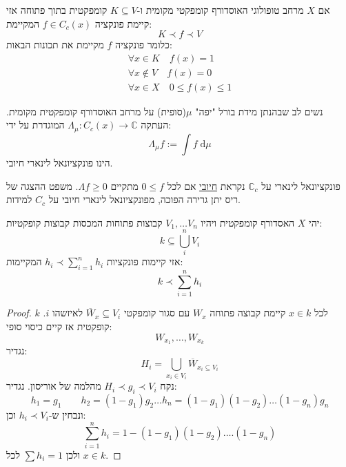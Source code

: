 \documentclass{tstextbook}
\begin{document}
\begin{theorem}
אם \(X\) מרחב טופולוגי האוסדורף קומפקטי מקומית ו-\(K\subseteq V\) קומפקטית בתוך פתוחה אזי קיימת פונקציה \(f\in C_{c}(x)\) המקיימת:
$$K \prec f \prec V$$
כלומר פונקציה \(f\) מקיימת את תכונות הבאות:
\begin{gather*}\forall x \in K \quad f(x)=1\\ \forall x \not  \in V \quad  f(x) = 0 \\ \forall x \in X \quad 0\leq f(x)\leq 1 
\end{gather*}

\end{theorem}
\begin{remark}
נשים לב שבהנתן מידת בורל "יפה" \(\mu\)(סופית) על מרחב האוסדורף קומפקטית מקומית. העתקה \(\Lambda_{\mu}:C_{c}(x)\to \mathbb{C}\) המוגדרת על ידי:
$$\Lambda_{\mu}f := \int f \;\mathrm{d} \mu $$
הינו פונקציונאל לינארי חיובי.

\end{remark}
\begin{definition}
פונקציונאל לינארי על \(\mathbb{C}_{c}\) נקראת \underline{חיובי} אם לכל \(0\leq f\) מתקיים \(\Lambda f \geq 0\). משפט ההצגה של ריס יתן גרירה הפוכה, מפונקציונאל לינארי חיובי על \(C_{c}\) למידות.

\end{definition}
\begin{lemma}
יהי \(X\) האסדורף קומפקטית ויהיו \(V_{1},\dots V_{n}\) קבוצות פתוחות המכסות קבוצות קופקטיות:
$$k\subseteq \bigcup_{i}^{n} V_{i}$$
אזי קיימות פונקציות \(h_{i}\prec \sum_{i=1}^{n}h_{i}\) המקיימות:
$$k\prec \sum_{i=1}^{n} h_{i}$$

\end{lemma}
\begin{proof}
לכל \(x \in k\) קיימת קבוצה פתוחה \(W_{x}\) עם סגור קומפקטי \(\overline{W}_{x}\subseteq V_{i}\) לאיזשהו \(i\). \(k\) קופקטית אז קיים כיסוי סופי:
$$W_{x_{1}},\dots,W_{x_{k}}$$
נגדיר:
$$H_{i}=\bigcup_{x_{i}\in V_{i}}\overline{W} _{x_{i}\subseteq V_{i}}$$
נקח \(H_{i}\prec g_{i}\prec V_{i}\) מהלמה של אוריסון. נגדיר:
$$h_{1}=g_{1}\qquad h_{2}=(1-g_{1})g_{2}\dots h_{n}=(1-g_{1})(1-g_{2})\dots(1-g_{n})g_{n}$$
ונבחין ש-\(h_{i}\prec V_{i}\) וכן:
$$\sum_{i=1}^{n} h_{i}= 1-(1-g_{1})(1-g_{2})\dots.(1-g_{n})$$
ולכן \(\sum h_{i}=1\) לכל \(x \in k\).

\end{proof}
\end{document}
